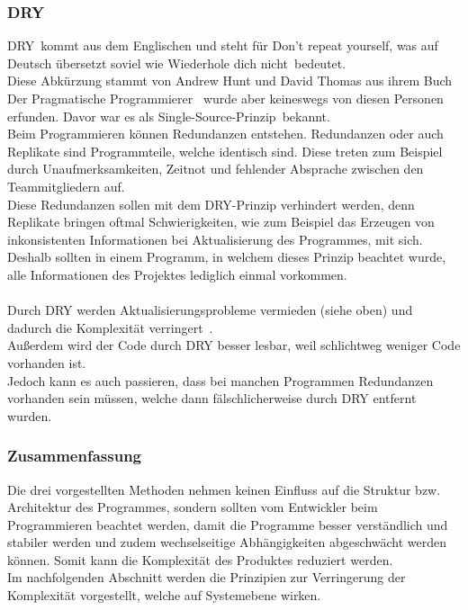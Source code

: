 \documentclass[a4paper, 10pt]{scrartcl}
\begin{document}
\subsubsection{DRY}
\glqq DRY\grqq \ kommt aus dem Englischen und steht für \glqq Don't repeat yourself\grqq, was auf Deutsch übersetzt soviel wie \glqq Wiederhole dich nicht\grqq\ bedeutet. \\
Diese Abkürzung stammt von Andrew Hunt und David Thomas aus ihrem Buch \glqq Der Pragmatische Programmierer\grqq\  \citep{hunt} wurde aber keineswegs von diesen Personen erfunden. Davor war es als \glqq Single-Source-Prinzip\grqq\  bekannt. \citep{goll_entwurfsprinzipien}\\
Beim Programmieren können Redundanzen entstehen. Redundanzen oder auch Replikate sind Programmteile, welche identisch sind. Diese treten zum Beispiel durch Unaufmerksamkeiten, Zeitnot und fehlender Absprache zwischen den Teammitgliedern auf.\\
Diese Redundanzen sollen mit dem DRY-Prinzip verhindert werden, denn Replikate bringen oftmal Schwierigkeiten, wie zum Beispiel das Erzeugen von inkonsistenten Informationen bei Aktualisierung des Programmes, mit sich. \\
Deshalb sollten in einem Programm, in welchem dieses Prinzip beachtet wurde,  alle Informationen des Projektes lediglich einmal vorkommen.
\\\\Durch DRY werden \glqq Aktualisierungsprobleme vermieden (siehe oben) und dadurch die Komplexität verringert\grqq\ \cite{goll_entwurfsprinzipien}.\\
Außerdem wird der Code durch DRY besser lesbar, weil schlichtweg weniger Code vorhanden ist.\\
Jedoch kann es auch passieren, dass bei manchen Programmen Redundanzen vorhanden sein müssen, welche dann fälschlicherweise durch DRY entfernt wurden.
\subsubsection{Zusammenfassung}
Die drei vorgestellten Methoden nehmen keinen Einfluss auf die Struktur bzw. Architektur des Programmes, sondern sollten vom Entwickler beim Programmieren beachtet werden, damit die Programme besser verständlich und stabiler werden und zudem wechselseitige Abhängigkeiten abgeschwächt werden können. Somit kann die Komplexität des Produktes reduziert werden. \citep{goll_entwurfsprinzipien}\\
Im nachfolgenden Abschnitt werden die Prinzipien zur Verringerung der Komplexität vorgestellt, welche auf Systemebene wirken.
\end{document}
